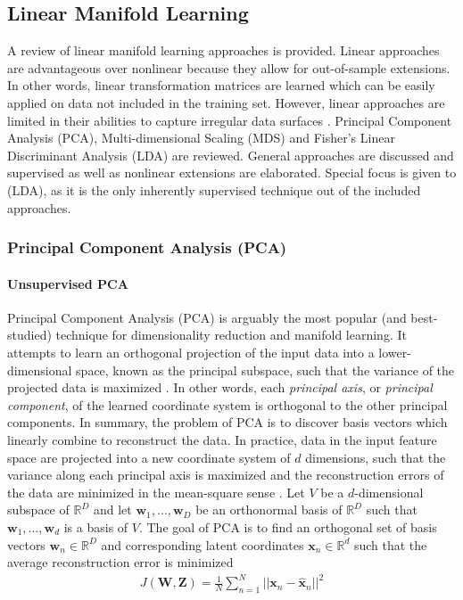 \subsection{Linear Manifold Learning}
A review of linear manifold learning approaches is provided.  Linear approaches are advantageous over nonlinear because they allow for out-of-sample extensions.  In other words, linear transformation matrices are learned which can be easily applied on data not included in the training set.  However, linear approaches are limited in their abilities to capture irregular data surfaces \citep{Kegl2008PrincipalManifoldsTextbook}.  Principal Component Analysis (PCA), Multi-dimensional Scaling (MDS) and Fisher's Linear Discriminant Analysis (LDA) are reviewed.  General approaches are discussed and supervised as well as nonlinear extensions are elaborated. Special focus is given to (LDA), as it is the only inherently supervised technique out of the included approaches.

\subsubsection{Principal Component Analysis (PCA)} \label{sec:PCA}

\paragraph{Unsupervised PCA}
Principal Component Analysis (PCA) is arguably the most popular (and best-studied) technique for dimensionality reduction and manifold learning.  It attempts to learn an orthogonal projection of the input data into a lower-dimensional space, known as the principal subspace, such that the variance of the projected data is maximized \citep{Chao2019RecentAdvancesSupervisedDimRed}.  In other words, each \textit{principal axis}, or \textit{principal component}, of the learned coordinate system is orthogonal to the other principal components.  In summary, the problem of PCA is to discover basis vectors which linearly combine to reconstruct the data.  In practice, data in the input feature space are projected into a new coordinate system of $d$ dimensions, such that the variance along each principal axis is maximized and the reconstruction errors of the data are minimized in the mean-square sense \citep{Thorstensen2009ManifoldThesis}.  Let $V$ be a $d$-dimensional subspace of $\mathbb{R}^{D}$ and let  $\bm{w}_1, \dots, \bm{w}_D$ be an orthonormal basis of $\mathbb{R}^{D}$ such that $\bm{w}_1, \dots, \bm{w}_d$ is a basis of $V$.  The goal of PCA is to find an orthogonal set of basis vectors $\bm{w}_n \in \mathbb{R}^{D}$ and corresponding latent coordinates $\bm{x}_n \in \mathbb{R}^{d}$ such that the average reconstruction error is minimized \citep{Murphy2012}
\begin{align}
	J(\bm{W}, \bm{Z}) = \frac{1}{N}\sum_{n=1}^{N} ||\bm{x}_n - \hat{\bm{x}}_n ||^{2}
\end{align}


